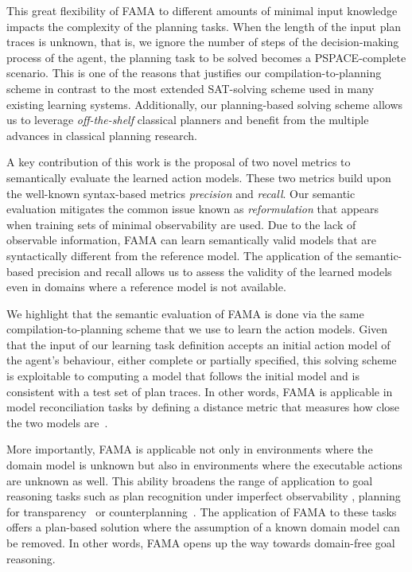 \documentclass[3p,times]{elsarticle}
\newcommand{\FAMA}{{\small {\sffamily FAMA}}\xspace}
\begin{document}
This great flexibility of \FAMA to different amounts of minimal input knowledge impacts the complexity of the planning tasks. When the length of the input plan traces is unknown, that is, we ignore the number of steps of the decision-making process of the agent, the planning task to be solved becomes a PSPACE-complete scenario. This is one of the reasons that justifies our compilation-to-planning scheme in contrast to the most extended SAT-solving scheme used in many existing learning systems. Additionally, our planning-based solving scheme allows us to leverage {\em off-the-shelf} classical planners and benefit from the multiple advances in classical planning research.

A key contribution of this work is the proposal of two novel metrics to semantically evaluate the learned action models. These two metrics build upon the well-known syntax-based metrics \emph{precision} and \emph{recall}. Our semantic evaluation mitigates the common issue known as \emph{reformulation} that appears when training sets of minimal observability are used. Due to the lack of observable information, \FAMA can learn semantically valid models that are syntactically different from the reference model. The application of the semantic-based precision and recall allows us to assess the validity of the learned models even in domains where a reference model is not available.

We highlight that the semantic evaluation of \FAMA is done via the same compilation-to-planning scheme that we use to learn the action models. Given that the input of our learning task definition accepts an initial action model of the agent's behaviour, either complete or partially specified, this solving scheme is exploitable to computing a model that follows the initial model and is consistent with a test set of plan traces. In other words, \FAMA is applicable in model reconciliation tasks by defining a distance metric that measures how close the two models are~\cite{KulkarniCZVZK16}.

More importantly, \FAMA is applicable not only in environments where the domain model is unknown but also in environments where the executable actions are unknown as well. This ability  broadens the range of application to goal reasoning tasks such as plan recognition under imperfect observability \cite{SohrabiRU16}, planning for transparency~\cite{MacNallyLRP18} or counterplanning~\cite{PozancoEFB18}. The application of \FAMA to these tasks offers a plan-based solution where the assumption of a known domain model can be removed. In other words, \FAMA opens up the way towards domain-free goal reasoning.
\end{document}
